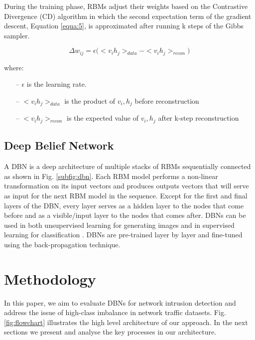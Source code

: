 \documentclass[runningheads]{llncs}
\begin{document}
During the training phase, \acp{RBM} adjust their weights based on the Contrastive Divergence (CD) algorithm in which the second expectation term of the gradient descent, Equation \ref{equa:5}, is approximated after running k steps of the Gibbs sampler.

\begin{equation}
\Delta{w_{ij}}=\epsilon\big(<v_{i}h_{j}>_{data}-<v_{i}h_{j}>_{recon}\big)
\label{equa:5}
\end{equation}

where:
\begin{itemize}
 \item[--] $\epsilon$ is the learning rate.
 \item[--] $<v_{i}h_{j}>_{data}$ is the product of $v_{i}, h_{j}$ before reconstruction
 \item[--] $<v_{i}h_{j}>_{recon}$ is the expected value of $v_{i}, h_{j}$ after k-step reconstruction
\end{itemize}

\subsection{Deep Belief Network}
\label{subsec:dbn}

A \ac{DBN} is a deep architecture of multiple stacks of \acp{RBM} sequentially connected as shown in Fig. \ref{subfig:dbn}. Each \ac{RBM} model performs a non-linear transformation on its input vectors and produces outputs vectors that will serve as input for the next \ac{RBM} model in the sequence. Except for the first and final layers of the \ac{DBN}, every layer serves as a hidden layer to the nodes that come before and as a visible/input layer to the nodes that comes after. \acp{DBN} can be used in both unsupervised learning for generating images and in supervised learning for classification \cite{Salama}. \acp{DBN} are pre-trained layer by layer and fine-tuned using the back-propagation technique. \section{Methodology}
\label{sec:methodology}

In this paper, we aim to evaluate \acp{DBN} for network intrusion detection and address the issue of high-class imbalance in network traffic datasets.  Fig. \ref{fig:flowchart} illustrates the high level architecture of our approach. In the next sections we present and analyse the key processes in our architecture. 
\end{document}
